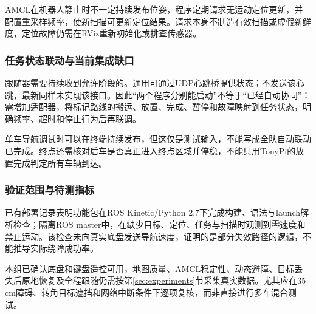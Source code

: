 AMCL在机器人静止时不一定持续发布位姿，程序定期请求无运动定位更新，并配置重采样频率，使新扫描可更新定位结果。请求本身不制造有效扫描或虚假新鲜度，定位故障仍需在RViz重新初始化或排查传感器。

\subsubsection{任务状态联动与当前集成缺口}
跟随器需要持续收到允许阶段的。通用可通过UDP心跳桥提供状态；不发送该心跳，最新同样未实现该接口。因此“两个程序分别能启动”不等于“已经自动协同”：需增加适配器，将标记路线的搬运、放置、完成、暂停和故障映射到任务状态，明确频率、超时和停止行为后再联调。

单车导航调试时可以在终端持续发布，但这仅是测试输入，不能写成全队自动联动已完成。终点还需核对后车是否真正进入终点区域并停稳，不能只用TonyPi的放置完成判定所有车辆到达。

\subsubsection{验证范围与待测指标}
已有部署记录表明功能包在ROS Kinetic/Python 2.7下完成构建、语法与launch解析检查；隔离ROS master中，在缺少目标、定位、任务与扫描时观测到零速度和禁止运动。该检查未向真实底盘发送导航速度，证明的是部分失效路径的逻辑，不能推导实际绕障成功率。

本组已确认底盘和键盘遥控可用，地图质量、AMCL稳定性、动态避障、目标丢失后原地恢复及全程跟随仍需按第\ref{sec:experiments}节采集真实数据。尤其应在35\,cm障碍、转角目标遮挡和网络中断条件下逐项复核，而非直接进行多车混合测试。
